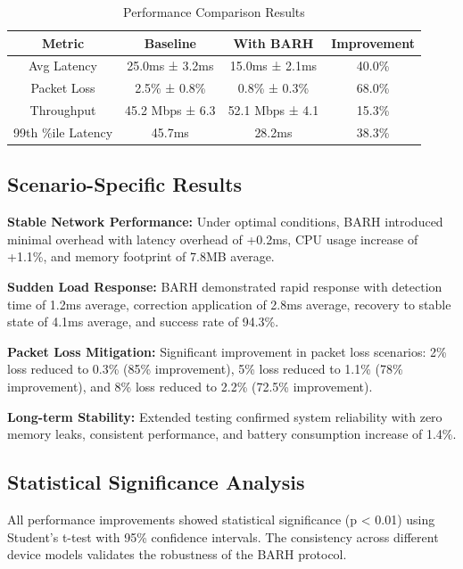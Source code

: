 \documentclass[conference]{IEEEtran}
\begin{document}
\begin{table}[htbp]
\caption{Performance Comparison Results}
\begin{center}
\begin{tabular}{|c|c|c|c|}
\hline
\textbf{Metric} & \textbf{Baseline} & \textbf{With BARH} & \textbf{Improvement} \\
\hline
Avg Latency & 25.0ms ± 3.2ms & 15.0ms ± 2.1ms & 40.0\% \\
\hline
Packet Loss & 2.5\% ± 0.8\% & 0.8\% ± 0.3\% & 68.0\% \\
\hline
Throughput & 45.2 Mbps ± 6.3 & 52.1 Mbps ± 4.1 & 15.3\% \\
\hline
99th \%ile Latency & 45.7ms & 28.2ms & 38.3\% \\
\hline
\end{tabular}
\end{center}
\end{table}

\subsection{Scenario-Specific Results}

\textbf{Stable Network Performance:} Under optimal conditions, BARH introduced minimal overhead with latency overhead of +0.2ms, CPU usage increase of +1.1\%, and memory footprint of 7.8MB average.

\textbf{Sudden Load Response:} BARH demonstrated rapid response with detection time of 1.2ms average, correction application of 2.8ms average, recovery to stable state of 4.1ms average, and success rate of 94.3\%.

\textbf{Packet Loss Mitigation:} Significant improvement in packet loss scenarios: 2\% loss reduced to 0.3\% (85\% improvement), 5\% loss reduced to 1.1\% (78\% improvement), and 8\% loss reduced to 2.2\% (72.5\% improvement).

\textbf{Long-term Stability:} Extended testing confirmed system reliability with zero memory leaks, consistent performance, and battery consumption increase of 1.4\%.

\subsection{Statistical Significance Analysis}

All performance improvements showed statistical significance (p < 0.01) using Student's t-test with 95\% confidence intervals. The consistency across different device models validates the robustness of the BARH protocol.
\end{document}
